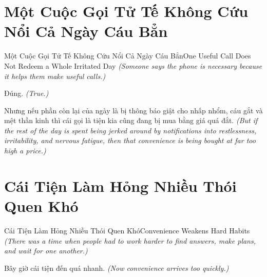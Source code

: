 \section{Một Cuộc Gọi Tử Tế Không Cứu Nổi Cả Ngày Cáu Bẳn}
\begin{truyen}{Một Cuộc Gọi Tử Tế Không Cứu Nổi Cả Ngày Cáu Bẳn}{One Useful Call Does Not Redeem a Whole Irritated Day}
\textit{(Someone says the phone is necessary because it helps them make useful calls.)}

Đúng.
\textit{(True.)}

Nhưng nếu phần còn lại của ngày là bị thông báo giật cho nhấp nhổm, cáu gắt và mệt thần kinh thì cái gọi là tiện kia cũng đang bị mua bằng giá quá đắt.
\textit{(But if the rest of the day is spent being jerked around by notifications into restlessness, irritability, and nervous fatigue, then that convenience is being bought at far too high a price.)}

\end{truyen}

\section{Cái Tiện Làm Hỏng Nhiều Thói Quen Khó}
\begin{truyen}{Cái Tiện Làm Hỏng Nhiều Thói Quen Khó}{Convenience Weakens Hard Habits}
\textit{(There was a time when people had to work harder to find answers, make plans, and wait for one another.)}

Bây giờ cái tiện đến quá nhanh.
\textit{(Now convenience arrives too quickly.)}

\end{truyen}

